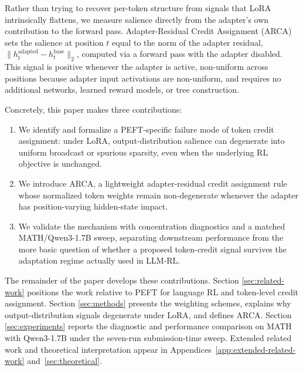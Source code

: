 Rather than trying to recover per-token structure from signals that LoRA
intrinsically flattens, we measure salience directly from the adapter's own
contribution to the forward pass. Adapter-Residual Credit Assignment (ARCA)
sets the salience at position $t$ equal to the norm of the adapter residual,
$\|h^{\text{adapted}}_t - h^{\text{base}}_t\|_2$, computed via a forward pass
with the adapter disabled. This signal is positive whenever the adapter is
active, non-uniform across positions because adapter input activations are
non-uniform, and requires no additional networks, learned reward models, or tree
construction.

Concretely, this paper makes three contributions:
\begin{enumerate}
    \item We identify and formalize a PEFT-specific failure mode of token
    credit assignment: under LoRA, output-distribution salience can degenerate
    into uniform broadcast or spurious sparsity, even when the underlying RL
    objective is unchanged.
    \item We introduce ARCA, a lightweight adapter-residual credit assignment
    rule whose normalized token weights remain non-degenerate whenever the
    adapter has position-varying hidden-state impact.
    \item We validate the mechanism with concentration diagnostics and a
    matched MATH/Qwen3-1.7B sweep, separating downstream performance from the
    more basic question of whether a proposed token-credit signal survives the
    adaptation regime actually used in LLM-RL.
\end{enumerate}

The remainder of the paper develops these contributions. Section
\ref{sec:related-work} positions the work relative to PEFT for language RL
and token-level credit assignment. Section \ref{sec:methods} presents the
weighting schemes, explains why output-distribution signals degenerate under
LoRA, and defines ARCA. Section \ref{sec:experiments} reports the diagnostic
and performance comparison on MATH with Qwen3-1.7B under the seven-run
submission-time sweep. Extended related work and theoretical interpretation
appear in Appendices~\ref{app:extended-related-work}
and~\ref{sec:theoretical}.
